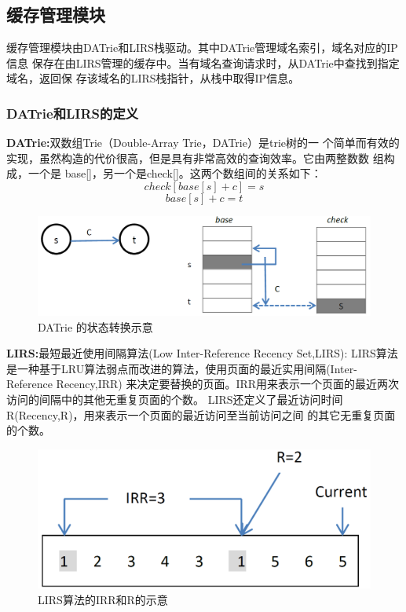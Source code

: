 

\subsection{缓存管理模块} 

缓存管理模块由DATrie和LIRS栈驱动。其中DATrie管理域名索引，域名对应的IP信息
保存在由LIRS管理的缓存中。当有域名查询请求时，从DATrie中查找到指定域名，返回保
存该域名的LIRS栈指针，从栈中取得IP信息。
\subsubsection{DATrie和LIRS的定义}
\noindent \textbf{DATrie:}双数组Trie（Double-Array Trie，DATrie）是trie树的一
个简单而有效的实现，虽然构造的代价很高，但是具有非常高效的查询效率。它由两整数数
组构成，一个是 base[]，另一个是check[]。这两个数组间的关系如下：$$check[base[s] + c] = s$$
$$base[s]+ c = t$$


\begin{figure}[H]
\centering
\includegraphics[keepaspectratio, scale=0.4]{pitures/aaa.png}
\caption{ DATrie 的状态转换示意} 
\end{figure}

\noindent \textbf{LIRS:}最短最近使用间隔算法(Low Inter-Reference Recency Set,LIRS): LIRS算法
	是一种基于LRU算法弱点而改进的算法，使用页面的最近实用间隔(Inter-Reference Recency,IRR)
	来决定要替换的页面。IRR用来表示一个页面的最近两次访问的间隔中的其他无重复页面的个数。
	LIRS还定义了最近访问时间R(Recency,R)，用来表示一个页面的最近访问至当前访问之间
	的其它无重复页面的个数。


\begin{figure}[H]
\centering
\includegraphics[keepaspectratio, scale=0.4]{pitures/irr.png}
\caption{LIRS算法的IRR和R的示意} 
\end{figure}

